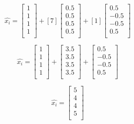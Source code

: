 \documentclass{article}
\begin{document}
 \[\hat{x_i}=
 \begin{bmatrix}
     1 \\
     1 \\
     1 \\
     1 \\
 \end{bmatrix}
 +[7]
 \begin{bmatrix}
     0.5 \\
     0.5 \\
     0.5 \\
     0.5 \\
 \end{bmatrix}
 +
 [1]
 \begin{bmatrix}
     0.5 \\
     -0.5 \\
     -0.5 \\
     0.5 \\
 \end{bmatrix}
 \]
 
 \[\hat{x_i}=
 \begin{bmatrix}
     1 \\
     1 \\
     1 \\
     1 \\
 \end{bmatrix}
 +
 \begin{bmatrix}
     3.5 \\
     3.5 \\
     3.5 \\
     3.5 \\
 \end{bmatrix}
 +
 \begin{bmatrix}
     0.5 \\
     -0.5 \\
     -0.5 \\
     0.5 \\
 \end{bmatrix}
 \]
 
 \[\hat{x_i}=
 \begin{bmatrix}
     5 \\
     4 \\
     4 \\
     5 \\
 \end{bmatrix}
 \]
 
 \newpage
 
 
\end{document}
